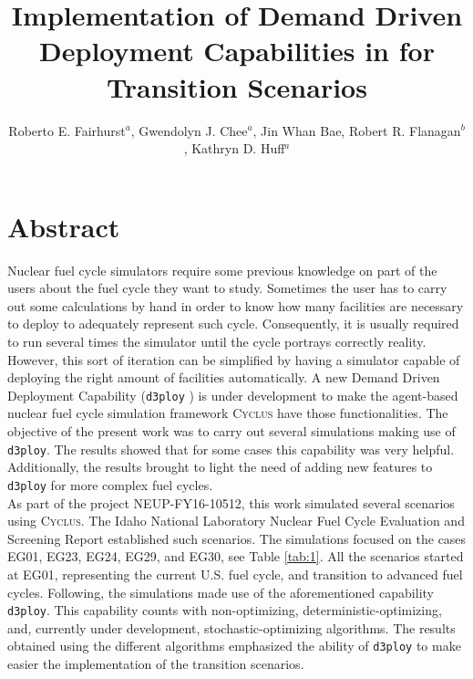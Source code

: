 \documentclass{anstrans}
\title{Implementation of Demand Driven Deployment Capabilities in \Cyclus for Transition Scenarios}
\author{Roberto E. Fairhurst$^a$, Gwendolyn J. Chee$^a$, Jin Whan Bae, Robert R. Flanagan$^b$, Kathryn D. Huff$^a$}
\institute{
$^a$University of Illinois at Urbana-Champaign, Dept. of Nuclear, Plasma, and Radiological Engineering\\
$^b$University of South Carolina, Nuclear Engineering Program\\
ref3@illinois.edu
}
\newcommand{\Cyclus}{\textsc{Cyclus}\xspace}%
\begin{document}
\section{Abstract}

Nuclear fuel cycle simulators require some previous knowledge on part of the users about the fuel cycle they want to study.
Sometimes the user has to carry out some calculations by hand in order to know how many facilities are necessary to deploy
to adequately represent such cycle. Consequently, it is usually required to run several times the simulator until the cycle
portrays correctly reality. However, this sort of iteration can be simplified by having a simulator capable of deploying the right
amount of facilities automatically. A new Demand Driven Deployment Capability (\texttt{d3ploy} \cite{chee_demonstration_2019})
is under development to make the agent-based nuclear fuel cycle simulation framework \Cyclus \cite{huff_fundamental_2016} have
those functionalities. The objective of the present work was to carry out several simulations making use of \texttt{d3ploy}.
The results showed that for some cases this capability was very helpful. Additionally, the results brought to light the need of
adding new features to \texttt{d3ploy} for more complex fuel cycles.
\\
As part of the project NEUP-FY16-10512, this work simulated several scenarios using \Cyclus. The Idaho National Laboratory
Nuclear Fuel Cycle Evaluation and Screening Report \cite{wigeland_nuclear_2014} established such scenarios. The simulations
focused on the cases EG01, EG23, EG24, EG29, and EG30, see Table \ref{tab:1}. All the scenarios started at EG01, representing
the current U.S. fuel cycle, and transition to advanced fuel cycles. Following, the simulations made use of the aforementioned
capability \texttt{d3ploy}. This capability counts with non-optimizing, deterministic-optimizing, and, currently under
development, stochastic-optimizing algorithms. The results obtained using the different algorithms emphasized the ability of
\texttt{d3ploy} to make easier the implementation of the transition scenarios.
\end{document}
